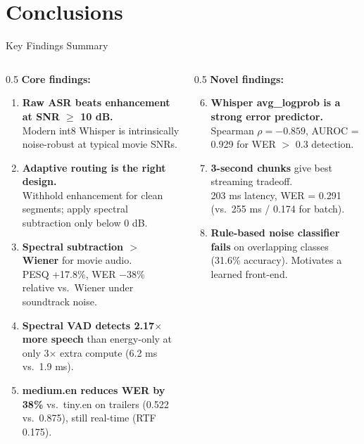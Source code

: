 \documentclass[aspectratio=169]{beamer}
\begin{document}
\section{Conclusions}
\begin{frame}{Key Findings Summary}
  \begin{columns}[T]
    \begin{column}{0.5\textwidth}
      \textbf{Core findings:}
      \begin{enumerate}
        \item \textbf{Raw ASR beats enhancement at SNR $\geq$ 10 dB.}\\
          Modern int8 Whisper is intrinsically noise-robust at typical movie SNRs.

        \item \textbf{Adaptive routing is the right design.}\\
          Withhold enhancement for clean segments; apply spectral subtraction only below 0 dB.

        \item \textbf{Spectral subtraction $>$ Wiener} for movie audio.\\
          PESQ +17.8\%, WER $-38\%$ relative vs.\ Wiener under soundtrack noise.

        \item \textbf{Spectral VAD detects 2.17$\times$ more speech} than energy-only at only 3$\times$ extra compute (6.2 ms vs.\ 1.9 ms).

        \item \textbf{medium.en reduces WER by 38\%} vs.\ tiny.en on trailers (0.522 vs.\ 0.875), still real-time (RTF 0.175).
      \end{enumerate}
    \end{column}
    \begin{column}{0.5\textwidth}
      \textbf{Novel findings:}
      \begin{enumerate}
        \setcounter{enumi}{5}
        \item \textbf{Whisper avg\_logprob is a strong error predictor.}\\
          Spearman $\rho = -0.859$, AUROC = 0.929 for WER $>$ 0.3 detection.

        \item \textbf{3-second chunks} give best streaming tradeoff.\\
          203 ms latency, WER = 0.291 (vs.\ 255 ms / 0.174 for batch).

        \item \textbf{Rule-based noise classifier fails} on overlapping classes (31.6\% accuracy). Motivates a learned front-end.


\end{enumerate}
\end{column}
\end{columns}
\end{frame}
\end{document}
